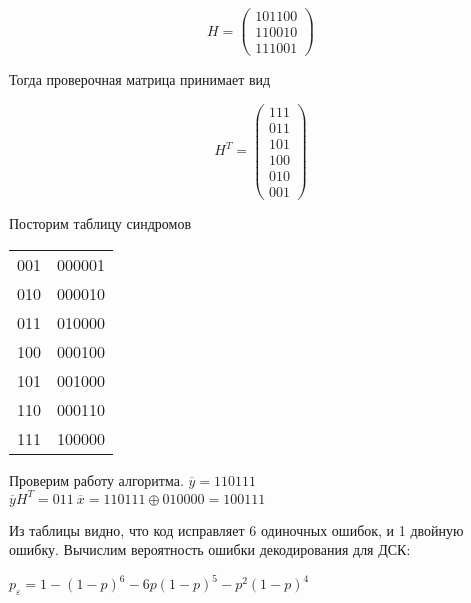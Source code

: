 \documentclass[../main.tex]{subfiles}
\begin{document}
\begin{equation*}
    H = \left( 
    \begin{array}{cccccc}
         101100  \\
         110010  \\
         111001
    \end{array}
    \right)
\end{equation*} 

Тогда проверочная матрица принимает вид

\begin{equation*}
    H^T = \left( 
    \begin{array}{ccc}
         111 \\
         011 \\
         101 \\
         100 \\
         010 \\
         001
    \end{array}
    \right)
\end{equation*} 

Посторим таблицу синдромов

\begin{center}
    \begin{tabular}{|c|c|}
    \hline
     001 & 000001\\ 
     010 & 000010\\ 
     011 & 010000\\ 
     100 & 000100\\ 
     101 & 001000\\ 
     110 & 000110\\ 
     111 & 100000\\\hline
\end{tabular}
\end{center}

Проверим работу алгоритма. \newline $\overline{y}=110111$ \newline
$\overline{y}H^T=011\ \overline{x}=110111 \oplus 010000 = 100111 $

Из таблицы видно, что код исправляет 6 одиночных ошибок, и 1 двойную ошибку. Вычислим вероятность ошибки декодирования для ДСК:

$p_\varepsilon=1-(1-p)^6 - 6p(1-p)^5 - p^2(1-p)^4$
\end{document}
